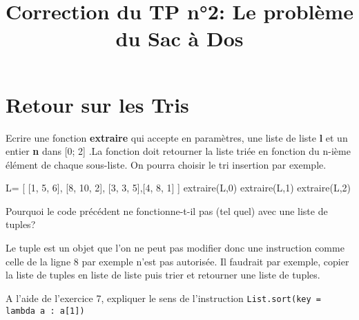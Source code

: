 \documentclass[a4paper,11,answers
]{exam}
\title{Correction du TP n°2: Le problème du Sac à Dos}
\begin{document}
\maketitle


\section{Retour sur les Tris}
 
 \begin{questions}

\question Ecrire une fonction \textbf{extraire} qui accepte en paramètres, une liste de liste  \textbf{l} et un entier \textbf{n}  dans [0; 2] .La fonction doit retourner la liste triée en fonction du n-ième  élément de chaque sous-liste. On pourra choisir le tri insertion par exemple.
 \vspace{5mm}
\begin{tcolorbox}[enhanced,attach boxed title to top center={yshift=-3mm,yshifttext=-1mm},
  colback=green!5!white,colframe=green!75!black,colbacktitle=green!25!black,
  title=Console Python, fonttitle=\bfseries,
  boxed title style={size=small,colframe=blue!25!black} ]
\begin{pyconsole}
L= [ [1, 5, 6], [8, 10, 2], [3, 3, 5],[4, 8, 1] ]
extraire(L,0)
extraire(L,1)
extraire(L,2)
\end{pyconsole}
\end{tcolorbox}


\question Pourquoi le code précédent ne fonctionne-t-il pas (tel quel) avec une liste de tuples?
\begin{solution}
Le tuple est un objet que l'on ne peut pas modifier donc une instruction comme celle de la ligne 8 par exemple n'est pas autorisée. Il faudrait par exemple, copier la liste de tuples en liste de liste puis trier et retourner une liste de tuples.
\end{solution}
\question A l'aide de l'exercice 7, expliquer le sens de l'instruction \texttt{List.sort(key = lambda a : a[1]) }


\end{questions}
\end{document}

